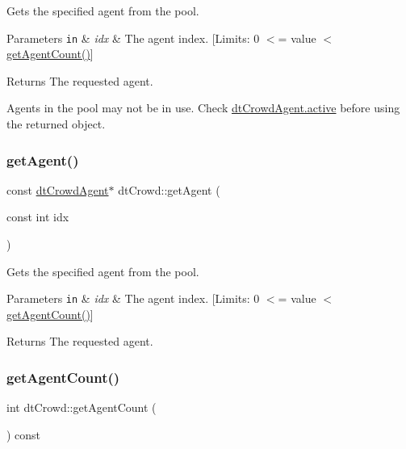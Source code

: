 Gets the specified agent from the pool. 
\begin{DoxyParams}[1]{Parameters}
\mbox{\tt in}  & {\em idx} & The agent index. \mbox{[}Limits\+: 0 $<$= value $<$ \hyperlink{classdtCrowd_a87dc2372038ee12d9043a65737880b78}{get\+Agent\+Count()}\mbox{]} \\
\hline
\end{DoxyParams}
\begin{DoxyReturn}{Returns}
The requested agent.
\end{DoxyReturn}
\begin{DoxyParagraph}{}

\end{DoxyParagraph}
Agents in the pool may not be in use. Check \hyperlink{structdtCrowdAgent_a6473f48354abf6f46f5b4d7ead9bca20}{dt\+Crowd\+Agent.\+active} before using the returned object. \mbox{\label{classdtCrowd_acd4ec16d485e2572357cd2c3339108cb}} 
\subsubsection{\texorpdfstring{get\+Agent()}{getAgent()}\hspace{0.1cm}{\footnotesize\ttfamily [2/2]}}
{\footnotesize\ttfamily const \hyperlink{structdtCrowdAgent}{dt\+Crowd\+Agent}$\ast$ dt\+Crowd\+::get\+Agent (\begin{DoxyParamCaption}\item[{const int}]{idx }\end{DoxyParamCaption})}

Gets the specified agent from the pool. 
\begin{DoxyParams}[1]{Parameters}
\mbox{\tt in}  & {\em idx} & The agent index. \mbox{[}Limits\+: 0 $<$= value $<$ \hyperlink{classdtCrowd_a87dc2372038ee12d9043a65737880b78}{get\+Agent\+Count()}\mbox{]} \\
\hline
\end{DoxyParams}
\begin{DoxyReturn}{Returns}
The requested agent. 
\end{DoxyReturn}
\mbox{\label{classdtCrowd_a87dc2372038ee12d9043a65737880b78}} 
\subsubsection{\texorpdfstring{get\+Agent\+Count()}{getAgentCount()}\hspace{0.1cm}{\footnotesize\ttfamily [1/2]}}
{\footnotesize\ttfamily int dt\+Crowd\+::get\+Agent\+Count (\begin{DoxyParamCaption}{ }\end{DoxyParamCaption}) const}


